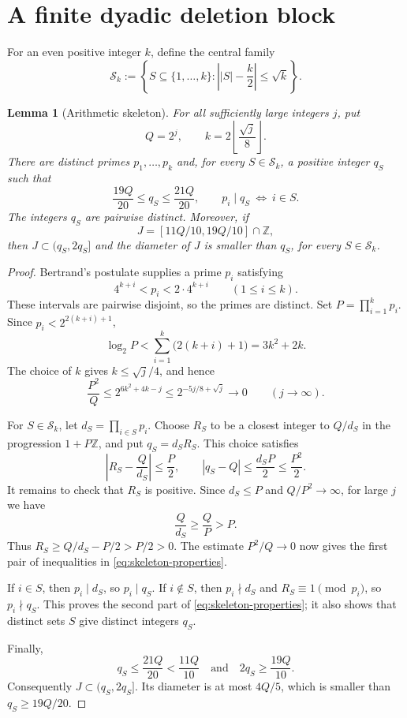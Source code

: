 \documentclass[11pt]{article}
\numberwithin{equation}{section}
\newtheorem{lemma}[theorem]{Lemma}
\theoremstyle{definition}
\theoremstyle{remark}
\newcommand{\Z}{\mathbb Z}
\newcommand{\cS}{\mathcal S}
\begin{document}
\section{A finite dyadic deletion block}\label{sec:block}

For an even positive integer \(k\), define the central family
\[
\cS_k:=\left\{S\subseteq\{1,\ldots,k\}:
       \left||S|-\frac{k}{2}\right|\le\sqrt{k}\right\}.
\]

\begin{lemma}[Arithmetic skeleton]\label{lem:skeleton}
For all sufficiently large integers \(j\), put
\[
 Q=2^j,\qquad k=2\left\lfloor\frac{\sqrt j}{8}\right\rfloor .
\]
There are distinct primes \(p_1,\ldots,p_k\) and, for every
\(S\in\cS_k\), a positive integer \(q_S\) such that
\begin{equation}\label{eq:skeleton-properties}
 \frac{19Q}{20}\le q_S\le\frac{21Q}{20},
 \qquad
 p_i\mid q_S\ \Longleftrightarrow\ i\in S .
\end{equation}
The integers \(q_S\) are pairwise distinct.  Moreover, if
\[
 J=[11Q/10,19Q/10]\cap\Z ,
\]
then \(J\subset(q_S,2q_S]\) and the diameter of \(J\) is smaller than
\(q_S\), for every \(S\in\cS_k\).
\end{lemma}

\begin{proof}
Bertrand's postulate \cite{HardyWright} supplies a prime \(p_i\) satisfying
\[
 4^{k+i}<p_i<2\cdot4^{k+i}\qquad(1\le i\le k).
\]
These intervals are pairwise disjoint, so the primes are distinct.  Set
\(P=\prod_{i=1}^k p_i\).  Since \(p_i<2^{2(k+i)+1}\),
\[
 \log_2 P
 <\sum_{i=1}^k\bigl(2(k+i)+1\bigr)
 =3k^2+2k.
\]
The choice of \(k\) gives \(k\le\sqrt j/4\), and hence
\[
 \frac{P^2}{Q}
 \le 2^{6k^2+4k-j}
 \le 2^{-5j/8+\sqrt j}\longrightarrow0
 \qquad(j\to\infty).
\]

For \(S\in\cS_k\), let \(d_S=\prod_{i\in S}p_i\).  Choose \(R_S\) to be
a closest integer to \(Q/d_S\) in the progression \(1+P\Z\), and put
\(q_S=d_SR_S\).  This choice satisfies
\[
 \left|R_S-\frac{Q}{d_S}\right|\le\frac P2,
 \qquad
 |q_S-Q|\le\frac{d_SP}{2}\le\frac{P^2}{2}.
\]
It remains to check that \(R_S\) is positive.  Since \(d_S\le P\) and
\(Q/P^2\to\infty\), for large \(j\) we have
\[
 \frac{Q}{d_S}\ge\frac QP>P.
\]
Thus \(R_S\ge Q/d_S-P/2>P/2>0\).  The estimate
\(P^2/Q\to0\) now gives the first pair of inequalities in
\eqref{eq:skeleton-properties}.

If \(i\in S\), then \(p_i\mid d_S\), so \(p_i\mid q_S\).  If
\(i\notin S\), then \(p_i\nmid d_S\) and
\(R_S\equiv1\pmod {p_i}\), so \(p_i\nmid q_S\).  This proves the second
part of \eqref{eq:skeleton-properties}; it also shows that distinct sets
\(S\) give distinct integers \(q_S\).

Finally,
\[
 q_S\le\frac{21Q}{20}<\frac{11Q}{10}
 \quad\text{and}\quad
 2q_S\ge\frac{19Q}{10}.
\]
Consequently \(J\subset(q_S,2q_S]\).  Its diameter is at most \(4Q/5\),
which is smaller than \(q_S\ge19Q/20\).
\end{proof}
\end{document}

